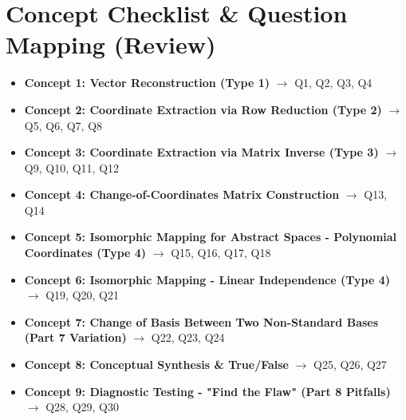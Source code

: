 \documentclass{article}
\begin{document}
\section*{Concept Checklist \& Question Mapping (Review)}
\begin{itemize}
    \item \textbf{Concept 1: Vector Reconstruction (Type 1)} $\rightarrow$ Q1, Q2, Q3, Q4
    \item \textbf{Concept 2: Coordinate Extraction via Row Reduction (Type 2)} $\rightarrow$ Q5, Q6, Q7, Q8
    \item \textbf{Concept 3: Coordinate Extraction via Matrix Inverse (Type 3)} $\rightarrow$ Q9, Q10, Q11, Q12
    \item \textbf{Concept 4: Change-of-Coordinates Matrix Construction} $\rightarrow$ Q13, Q14
    \item \textbf{Concept 5: Isomorphic Mapping for Abstract Spaces - Polynomial Coordinates (Type 4)} $\rightarrow$ Q15, Q16, Q17, Q18
    \item \textbf{Concept 6: Isomorphic Mapping - Linear Independence (Type 4)} $\rightarrow$ Q19, Q20, Q21
    \item \textbf{Concept 7: Change of Basis Between Two Non-Standard Bases (Part 7 Variation)} $\rightarrow$ Q22, Q23, Q24
    \item \textbf{Concept 8: Conceptual Synthesis \& True/False} $\rightarrow$ Q25, Q26, Q27
    \item \textbf{Concept 9: Diagnostic Testing - "Find the Flaw" (Part 8 Pitfalls)} $\rightarrow$ Q28, Q29, Q30
\end{itemize}
\end{document}
